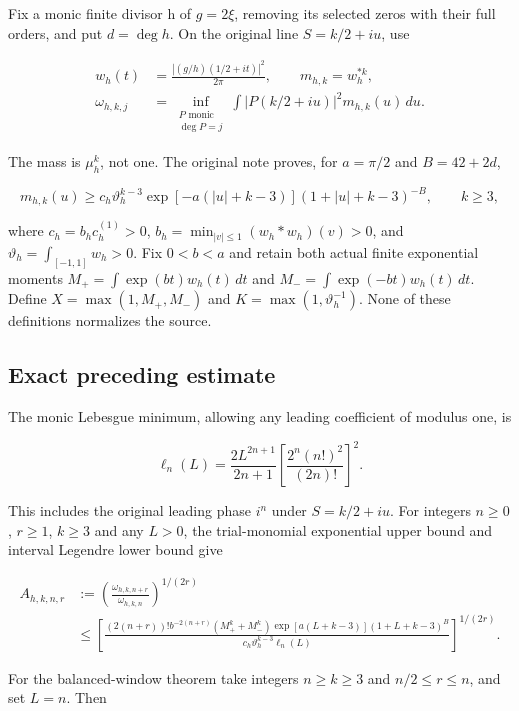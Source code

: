 Fix a monic finite divisor h of \(g=2\xi\), removing its selected zeros with their full orders, and put \(d=\deg h\). On the original line \(S=k/2+iu\), use

\[
\begin{aligned}
w_h(t)&=\frac{|(g/h)(1/2+it)|^2}{2\pi},\qquad m_{h,k}=w_h^{*k},\\
\omega_{h,k,j}&=\inf_{\substack{P\text{ monic}\\\deg P=j}}
\int |P(k/2+iu)|^2m_{h,k}(u)\,du.
\end{aligned}
\]

The mass is \(\mu_h^k\), not one. The original note proves, for \(a=\pi/2\) and \(B=42+2d\),

\[
m_{h,k}(u)\ge c_h\vartheta_h^{k-3}
\exp[-a(|u|+k-3)](1+|u|+k-3)^{-B},\qquad k\ge3,
\]

where \(c_h=b_hc_h^{(1)}>0\), \(b_h=\min_{|v|\le1}(w_h*w_h)(v)>0\), and \(\vartheta_h=\int_{[-1,1]}w_h>0\). Fix \(0<b<a\) and retain both actual finite exponential moments \(M_+=\int\exp(bt)w_h(t)\,dt\) and \(M_-=\int\exp(-bt)w_h(t)\,dt\). Define \(X=\max(1,M_+,M_-)\) and \(K=\max(1,\vartheta_h^{-1})\). None of these definitions normalizes the source.

\subsection[\hspace{0.4em}Exact preceding estimate]{Exact preceding estimate}\label{balanced-window-exact-preceding-estimate}

The monic Lebesgue minimum, allowing any leading coefficient of modulus one, is

\[
\ell_n(L)=\frac{2L^{2n+1}}{2n+1}
\left[\frac{2^n(n!)^2}{(2n)!}\right]^2.
\]

This includes the original leading phase \(i^n\) under \(S=k/2+iu\). For integers \(n\ge0\), \(r\ge1\), \(k\ge3\) and any \(L>0\), the trial-monomial exponential upper bound and interval Legendre lower bound give

\[
\begin{aligned}
A_{h,k,n,r}&:=\left(\frac{\omega_{h,k,n+r}}{\omega_{h,k,n}}\right)^{1/(2r)}\\
&\le\left[
\frac{(2(n+r))!b^{-2(n+r)}(M_+^k+M_-^k)
\exp[a(L+k-3)](1+L+k-3)^B}
{c_h\vartheta_h^{k-3}\ell_n(L)}\right]^{1/(2r)}.
\end{aligned}\tag{BV.1}
\]

For the balanced-window theorem take integers \(n\ge k\ge3\) and \(n/2\le r\le n\), and set \(L=n\). Then

